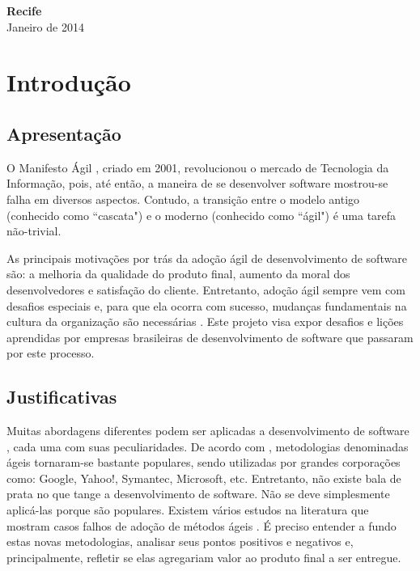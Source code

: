 \documentclass[a4paper,11pt]{article}
\begin{document}
\vspace{3.0cm}
\begin{center}
{\large {\bf Recife}\\[6mm]
Janeiro de 2014}
\end{center}
\newpage

\tableofcontents

\newpage
\pagestyle {plain}
\setcounter{page}{0} 

\section{Introdução}
\subsection{Apresentação}
O Manifesto Ágil \cite{agileManifesto}, criado em 2001, revolucionou o mercado de Tecnologia da Informação, pois, até então, a maneira de se desenvolver software mostrou-se falha em diversos aspectos. Contudo, a transição entre o modelo antigo (conhecido como ``cascata") e o moderno (conhecido como ``ágil") é uma tarefa não-trivial.

As principais motivações por trás da adoção ágil de desenvolvimento de software são: a melhoria da qualidade do produto final, aumento da moral dos desenvolvedores e satisfação do cliente. Entretanto, adoção ágil sempre vem com desafios especiais e, para que ela ocorra com sucesso, mudanças fundamentais na cultura da organização são necessárias \cite{Hassan2011}. Este projeto visa expor desafios e lições aprendidas por empresas brasileiras de desenvolvimento de software que passaram por este processo.
\subsection{Justificativas}
Muitas abordagens diferentes podem ser aplicadas a desenvolvimento de software \cite{Kettunen2010}, cada uma com suas peculiaridades. De acordo com \cite{Shore2007}, metodologias denominadas ágeis tornaram-se bastante populares, sendo utilizadas por grandes corporações como: Google, Yahoo!, Symantec, Microsoft, etc. Entretanto, não existe bala de prata no que tange a desenvolvimento de software. Não se deve simplesmente aplicá-las porque são populares. Existem vários estudos na literatura que mostram casos falhos de adoção de métodos ágeis \cite{Krasteva2008}. É preciso entender a fundo estas novas metodologias, analisar seus pontos positivos e negativos e, principalmente, refletir se elas agregariam valor ao produto final a ser entregue.
\end{document}
